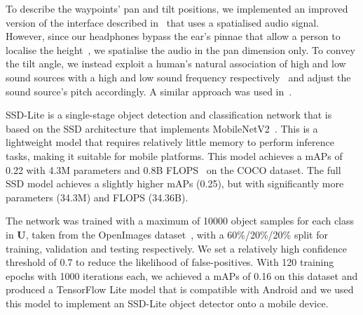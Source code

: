 \documentclass[runningheads]{llncs}
\newcommand\todo[1]{\textcolor{red}{#1}}
\begin{document}
To describe the waypoints' pan and tilt positions, we implemented an improved version of the interface described in~\cite{bellotto2013} that uses a spatialised audio signal.
However, since our headphones bypass the ear's pinnae that allow a person to localise the height~\cite{roffler1968factors}, we spatialise the audio in the pan dimension only.
To convey the tilt angle, we instead exploit a human's natural association of high and low sound sources with a high and low sound frequency respectively~\cite{blauert1997spatial} and adjust the sound source's pitch accordingly. 
A similar approach was used in~\cite{schauerte2012assistive}.


SSD-Lite is a single-stage object detection and classification network that is based on the SSD architecture that implements MobileNetV2~\cite{sandler2018mobilenetv2}.
This is a lightweight model that requires relatively little memory to perform inference tasks, making it suitable for mobile platforms. 
This model achieves a mAPs of 0.22 with 4.3M parameters and 0.8B FLOPS~\cite{li2018tinydsod} on the COCO dataset.
The full SSD model achieves a slightly higher mAPs (0.25), but with significantly more parameters (34.3M) and FLOPS (34.36B).

The network was trained with a maximum of 10000 object samples for each class in $\mathbf{U}$, taken from the OpenImages dataset~\cite{openimages}, with a 60\%/20\%/20\% split for training, validation and testing respectively.
We set a relatively high confidence threshold of 0.7 to reduce the likelihood of false-positives.
With 120 training epochs with 1000 iterations each, we achieved a mAPs of 0.16 on this dataset and produced a TensorFlow Lite model that is compatible with Android and we used this model to implement an SSD-Lite object detector onto a mobile device.
\end{document}
